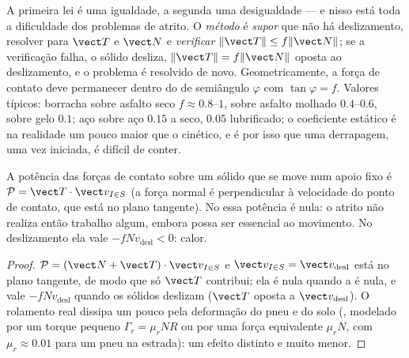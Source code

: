 \begin{remark}\label{rem:b2:rigid-body-mechanics:reading}
A primeira lei é uma igualdade, a segunda uma desigualdade --- e nisso
está toda a dificuldade dos problemas de atrito. O \emph{método} é
\emph{supor} que não há deslizamento, resolver para $\vect T$ e $\vect N$ e
\emph{verificar} $\|\vect T\| \le f\|\vect N\|$; se a verificação falha, o
sólido desliza, $\|\vect T\| = f\|\vect N\|$ oposta ao deslizamento, e o
problema é resolvido de novo. Geometricamente, a força de contato deve
permanecer dentro do \emph{} de semiângulo $\varphi$ com $\tan\varphi
= f$. Valores típicos: borracha sobre asfalto seco $f \approx 0.8$--$1$, sobre
asfalto molhado $0.4$--$0.6$, sobre gelo $0.1$; aço sobre aço $0.15$ a seco, $0.05$
lubrificado; o coeficiente estático é na realidade um pouco maior que o
cinético, e é por isso que uma derrapagem, uma vez iniciada, é difícil de conter.
\end{remark}

\begin{proposition}\label{prop:b2:rigid-body-mechanics:power}
A potência das forças de contato sobre um sólido que se move num apoio
fixo é $\mathcal P = \vect T\cdot\vect v_{I\in S}$ (a força normal é
perpendicular à velocidade do ponto de contato, que está no plano
tangente). No \emph{} essa potência é nula:
o atrito não realiza então trabalho algum, embora possa ser essencial ao movimento.
No deslizamento ela vale $-f N v_{\text{desl}} < 0$: calor.
\end{proposition}

\begin{proof}
$\mathcal P = (\vect N + \vect T)\cdot\vect v_{I\in S}$ e $\vect
v_{I\in S} = \vect v_{\text{desl}}$ está no plano tangente, de modo que só
$\vect T$ contribui; ela é nula quando a  é nula, e vale
$-fNv_{\text{desl}}$ quando os sólidos deslizam ($\vect T$ oposta a $\vect
v_{\text{desl}}$). O rolamento real dissipa um pouco pela deformação do
pneu e do solo (\emph{}, modelado por um
torque pequeno $\Gamma_r = \mu_rNR$ ou por uma força equivalente $\mu_rN$, com
$\mu_r \approx 0.01$ para um pneu na estrada): um efeito distinto e muito menor.
\end{proof}

